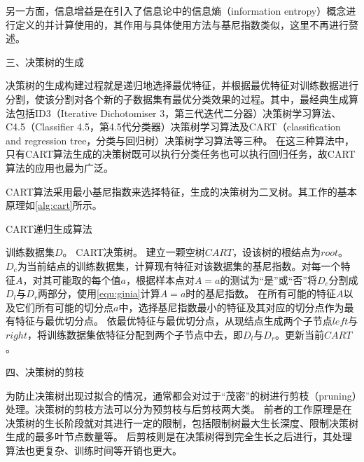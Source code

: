 另一方面，信息增益是在引入了信息论中的信息熵（information entropy）概念进行定义的并计算使用的，其作用与具体使用方法与基尼指数类似，这里不再进行赘述\cite{Zhou2016,Li2017}。

三、决策树的生成

决策树的生成构建过程就是递归地选择最优特征，并根据最优特征对训练数据进行分割，使该分割对各个新的子数据集有最优分类效果的过程。其中，最经典生成算法包括ID3（Iterative Dichotomiser 3，第三代迭代二分器）决策树学习算法、
C4.5（Classifier 4.5，第4.5代分类器）决策树学习算法及CART（classification and regression tree，分类与回归树）决策树学习算法等三种\cite{quinlan1986,quinlan1993,breiman1984}。
在这三种算法中，只有CART算法生成的决策树既可以执行分类任务也可以执行回归任务，故CART算法的应用也最为广泛。

CART算法采用最小基尼指数来选择特征，生成的决策树为二叉树。其工作的基本原理如\autoref{alg:cart}所示。
\begin{breakablealgorithm}
    \caption[CART生成算法]{CART递归生成算法\cite{Li2017}}
    \label{alg:cart}
    \begin{algorithmic}[1] %
        \Require 训练数据集$D$。
        \Ensure CART决策树。
        \State 建立一颗空树$CART$，设该树的根结点为$root$。
            \State $D_c$为当前结点的训练数据集，计算现有特征对该数据集的基尼指数。对每一个特征$A$，对其可能取的每个值$a$，根据样本点对$A=a$的测试为“是”或“否”将$D_c$分割成$D_l$与$D_r$两部分，使用\autoref{equ:ginia}计算$A=a$时的基尼指数。
            \State 在所有可能的特征$A$以及它们所有可能的切分点$a$中，选择基尼指数最小的特征及其对应的切分点作为最有特征与最优切分点。
            \State 依最优特征与最优切分点，从现结点生成两个子节点$left$与$right$，将训练数据集依特征分配到两个子节点中去，即$D_l$与$D_r$。更新当前$CART$。
                \State {}
            \Else    
                \State {}
                \State {}
            \EndIf
        \EndFunction
    \end{algorithmic}
\end{breakablealgorithm}

四、决策树的剪枝

为防止决策树出现过拟合的情况，通常都会对过于“茂密”的树进行剪枝（pruning）处理。决策树的剪枝方法可以分为预剪枝与后剪枝两大类。
前者的工作原理是在决策树的生长阶段就对其进行一定的限制，包括限制树最大生长深度、限制决策树生成的最多叶节点数量等。
后剪枝则是在决策树得到完全生长之后进行，其处理算法也更复杂、训练时间等开销也更大\cite{Zhou2016,Liu2018}。

